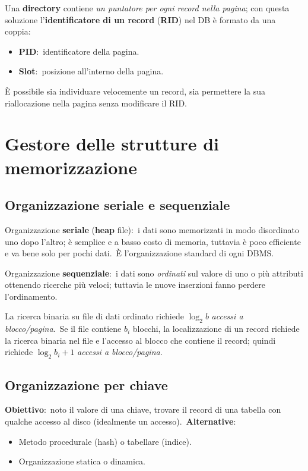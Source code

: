 \noindent Una \textbf{directory} contiene \textit{un puntatore per ogni record nella pagina}; con questa soluzione l'\textbf{identificatore di un record} (\textbf{RID}) nel DB è formato da una coppia:
\begin{itemize}
	\item \textbf{PID}:\ identificatore della pagina.
	\item \textbf{Slot}:\ posizione all'interno della pagina.
\end{itemize}

\noindent È possibile sia individuare velocemente un record, sia permettere la sua rial\-locazione nella pagina senza modificare il RID.\

\section{Gestore delle strutture di memorizzazione}

\subsection{Organizzazione seriale e sequenziale}

Organizzazione \textbf{seriale} (\textbf{heap} file):\ i dati sono memorizzati in modo disordinato uno dopo l'altro; è semplice e a basso costo di memoria, tuttavia è poco efficiente e va bene solo per pochi dati.\
È l'organizzazione standard di ogni DBMS.

\vspace{12pt}

\noindent Organizzazione \textbf{sequenziale}:\ i dati sono \textit{ordinati} sul valore di uno o più attributi ottenendo ricerche più veloci; tuttavia le nuove inserzioni fanno perdere l'ordinamento.

La ricerca binaria su file di dati ordinato richiede $\log_2 b$ \textit{accessi a blocco{\slash}pa\-gina}.\
Se il file contiene $b_i$ blocchi, la localizzazione di un record richiede la ricerca binaria nel file e l'accesso al blocco che contiene il record; quindi richiede $\log_2 b_i + 1$ \textit{accessi a blocco{\slash}pagina}.

\subsection{Organizzazione per chiave}

\textbf{Obiettivo}:\ noto il valore di una chiave, trovare il record di una tabella con qualche accesso al disco (idealmente un accesso).\
\textbf{Alternative}:
\begin{itemize}
	\item Metodo procedurale (hash) o tabellare (indice).
	\item Organizzazione statica o dinamica.
\end{itemize}

